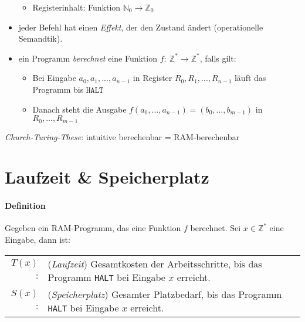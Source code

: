 \begin{itemize}
\begin{itemize}
		 \item Registerinhalt: Funktion $\mathbb{N}_0 \to \mathbb{Z}_0$
		\end{itemize}
	\item jeder Befehl hat einen \emph{Effekt}, der den Zustand ändert (operationelle Semandtik).
	\item ein Programm \emph{berechnet} eine Funktion $f{:}\ \mathbb{Z}^* \to \mathbb{Z}^*$, falls gilt:
		\begin{itemize}
		 \item Bei Eingabe $a_0, a_1, ..., a_{n-1}$ in Register $R_0, R_1, ..., R_{n-1}$ läuft das Programm bis $\texttt{HALT}$
		 \item Danach steht die Ausgabe $f(a_0,...,a_{n-1}) = (b_0,...,b_{m-1})$ in $R_0, ..., R_{m-1}$
		\end{itemize}
    \end{itemize}
	\emph{Church-Turing-These}: intuitive berechenbar = RAM-berechenbar

\section{Laufzeit \& Speicherplatz}
\paragraph{Definition} Gegeben ein RAM-Programm, das eine Funktion $f$ berechnet. Sei $x \in \mathbb{Z}^*$ eine Eingabe, dann ist:
\begin{center}
 \begin{tabular}{rp{}}
  $T(x)$: & (\emph{Laufzeit}) Gesamtkosten der Arbeitsschritte, bis das Programm \texttt{HALT} bei Eingabe $x$ erreicht. \\
  $S(x)$: & (\emph{Speicherplatz}) Gesamter Platzbedarf, bis das Programm \texttt{HALT} bei Eingabe $x$ erreicht. 
 \end{tabular}
\end{center}
